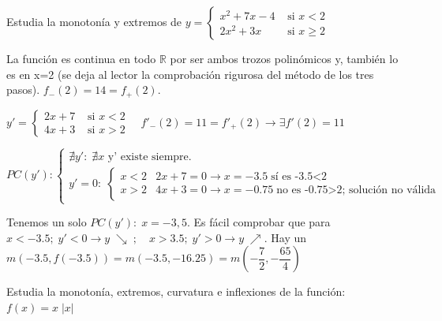 	\begin{ejre}
	Estudia la monotonía y extremos de $y=\begin{cases}
	   x^2+7x-4 & \mbox{ si } x<2  \\
	  2x^2+3x & \mbox{ si } x\ge 2
	\end{cases}$	
	\end{ejre}

	\begin{proofw}\renewcommand{\qedsymbol}{$\diamond$}
	
	La función es continua en todo $\mathbb R$ por ser ambos trozos polinómicos y, también lo es en x=2 (se deja al lector la comprobación rigurosa del método de los tres pasos). $f_-(2)=14=f_+(2)$.
	
	 $y'=\begin{cases}
	   2x+7 & \mbox{ si } x<2  \\
	 4x+3 & \mbox{ si } x> 2
	\end{cases} \quad f'_-(2)=11=f'_+(2) \to \exists f'(2)=11 $
	
	$PC(y'): \begin{cases}
 	\nexists y': \; \nexists x \mbox{ y' existe siempre.}\\
 	y'=0: \; \begin{cases}
 	x<2 & 2x+7=0 \to x=-3.5 \; \mbox{sí es -3.5<2} \\
 	x>2 &4x+3=0 \to x=-0.75  \; \mbox{no es -0.75>2; solución no  válida}
 	\end{cases}
 	\end{cases}$
	
	Tenemos un solo $PC(y'):\; x=-3,5$. Es fácil comprobar que para $x<-3.5; \; y'<0 \to y\; \searrow \; ; \quad x>3.5; \; y'>0 \to y \;  \nearrow$. Hay un $m(-3.5,f(-3.5))=m(-3.5, -16.25)=m\left(-\dfrac 7 2, -\dfrac {65}4 \right)$
	\end{proofw}
	
	\begin{ejre} Estudia la monotonía, extremos, curvatura e inflexiones de la función: $f(x)=x\; |x|$
		
	\end{ejre}
	

